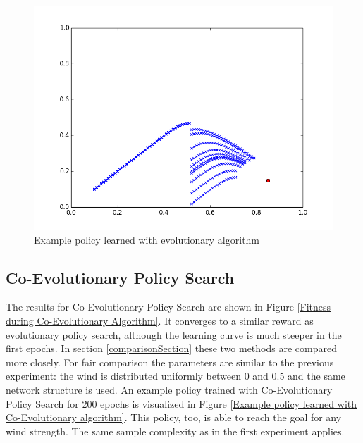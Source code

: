 \begin{figure}[ht]
  \centering
  \includegraphics[scale=0.5]{images/evo_result.png}
  \caption{Example policy learned with evolutionary algorithm}\label{Example policy learned with evolutionary algorithm}
\end{figure}

\pagebreak

\subsection{Co-Evolutionary Policy Search}

The results for Co-Evolutionary Policy Search are shown in Figure \ref{Fitness during Co-Evolutionary Algorithm}. It converges to a similar reward as evolutionary policy search, although the learning curve is much steeper in the first epochs. In section \ref{comparisonSection} these two methods are compared more closely. For fair comparison the parameters are similar to the previous experiment: the wind is distributed uniformly between 0 and 0.5 and the same network structure is used. An example policy trained with Co-Evolutionary Policy Search for 200 epochs is visualized in Figure \ref{Example policy learned with Co-Evolutionary algorithm}. This policy, too, is able to reach the goal for any wind strength. The same sample complexity as in the first experiment applies.

